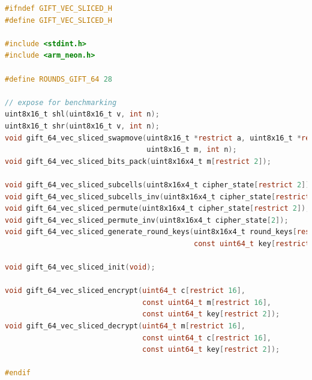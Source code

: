 \documentclass[12pt]{report}
\begin{document}
\begin{lstlisting}[language=c, caption={gift\_vec\_sliced.h}]
#ifndef GIFT_VEC_SLICED_H
#define GIFT_VEC_SLICED_H

#include <stdint.h>
#include <arm_neon.h>

#define ROUNDS_GIFT_64 28

// expose for benchmarking
uint8x16_t shl(uint8x16_t v, int n);
uint8x16_t shr(uint8x16_t v, int n);
void gift_64_vec_sliced_swapmove(uint8x16_t *restrict a, uint8x16_t *restrict b,
                                 uint8x16_t m, int n);
void gift_64_vec_sliced_bits_pack(uint8x16x4_t m[restrict 2]);

void gift_64_vec_sliced_subcells(uint8x16x4_t cipher_state[restrict 2]);
void gift_64_vec_sliced_subcells_inv(uint8x16x4_t cipher_state[restrict 2]);
void gift_64_vec_sliced_permute(uint8x16x4_t cipher_state[restrict 2]);
void gift_64_vec_sliced_permute_inv(uint8x16x4_t cipher_state[2]);
void gift_64_vec_sliced_generate_round_keys(uint8x16x4_t round_keys[restrict ROUNDS_GIFT_64][2],
                                            const uint64_t key[restrict 2]);

void gift_64_vec_sliced_init(void);

void gift_64_vec_sliced_encrypt(uint64_t c[restrict 16],
                                const uint64_t m[restrict 16],
                                const uint64_t key[restrict 2]);
void gift_64_vec_sliced_decrypt(uint64_t m[restrict 16],
                                const uint64_t c[restrict 16],
                                const uint64_t key[restrict 2]);

#endif
\end{lstlisting}
\end{document}
